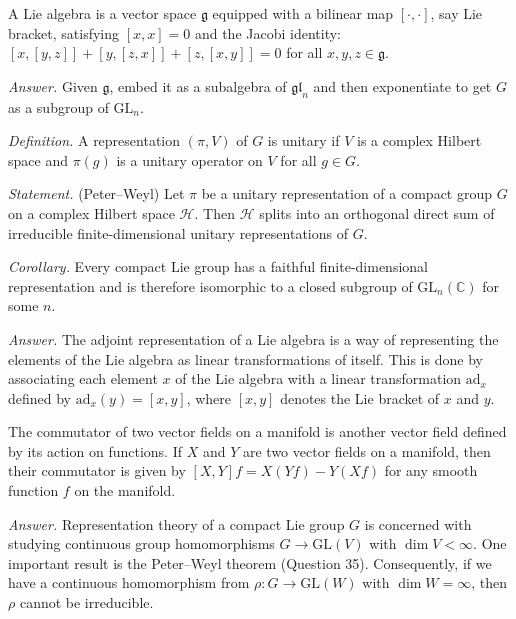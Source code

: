 \documentclass{mathproblems}
\newcommand\C{\mathbb{C}}
\newcommand\GL{\mathrm{GL}}
\newcommand\ad{\mathrm{ad}}
\begin{document}
\begin{questions}
A Lie algebra is a vector space $\mathfrak{g}$ equipped with a bilinear map $[\cdot,\cdot]$, say Lie bracket, satisfying $[x,x]=0$ and the Jacobi identity: $[x,[y,z]]+[y,[z,x]]+[z,[x,y]]=0$ for all $x,y,z\in \mathfrak{g}$.

\textit{Answer.} Given $\mathfrak{g}$, embed it as a subalgebra of $\mathfrak{gl}_n$ and then exponentiate to get $G$ as a subgroup of $\GL_n$.


\textit{Definition.} A representation $(\pi,V)$ of $G$ is unitary if $V$ is a complex Hilbert space and $\pi(g)$ is a unitary operator on $V$ for all $g\in G$.

{\color{violet}
\textit{Statement.} (Peter--Weyl) Let $\pi$ be a unitary representation of a compact group $G$ on a complex Hilbert space $\mathcal{H}$. Then $\mathcal{H}$ splits into an orthogonal direct sum of irreducible finite-dimensional unitary representations of $G$.}

\textit{Corollary.} Every compact Lie group has a faithful finite-dimensional representation and is therefore isomorphic to a closed subgroup of $\GL_n(\C)$ for some $n$.



\textit{Answer.} The adjoint representation of a Lie algebra is a way of representing the elements of the Lie algebra as linear transformations of itself. This is done by associating each element $x$ of the Lie algebra with a linear transformation $\ad_x$ defined by $\ad_x(y) = [x,y]$, where $[x,y]$ denotes the Lie bracket of $x$ and $y$.

The commutator of two vector fields on a manifold is another vector field defined by its action on functions. If $X$ and $Y$ are two vector fields on a manifold, then their commutator is given by $[X,Y]f = X(Yf) - Y(Xf)$ for any smooth function $f$ on the manifold.




\textit{Answer.} Representation theory of a compact Lie group $G$ is concerned with studying continuous group homomorphisms $G\to \GL(V)$ with $\dim V<\infty$. One important result is the Peter--Weyl theorem (Question 35). Consequently, if we have a continuous homomorphism from $\rho:G\to\GL(W)$ with $\dim W=\infty$, then $\rho$ cannot be irreducible.




\end{questions}
\end{document}
